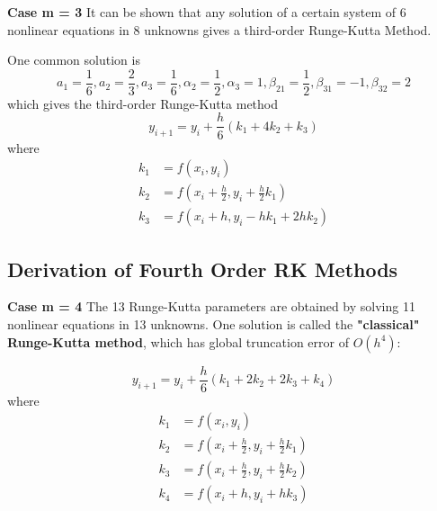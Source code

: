 \documentclass [titlepage,12pt,letter] {article}
\begin{document}
{\bf Case  m = 3}
It can be shown that any solution of a certain system of 6 nonlinear equations in 8 unknowns gives a third-order Runge-Kutta Method.

One common solution is
\[
a_1=\frac{1}{6}, a_2=\frac{2}{3}, a_3=\frac{1}{6}, \alpha_2=\frac{1}{2}, \alpha_3=1, \beta_{21}=\frac{1}{2}, \beta_{31}=-1, \beta_{32}=2
\]
which gives the third-order Runge-Kutta method
\[
y_{i+1}=y_i+\frac{h}{6}(k_1+4k_2+k_3)
\]
where
\begin{align*}
k_1 &= f(x_i,y_i) \\
k_2 & = f\left(x_i+\frac{h}{2},y_i+\frac{h}{2}k_1\right) \\
k_3 &= f(x_i+h,y_i-hk_1+2hk_2)
\end{align*}

\subsection{Derivation of Fourth Order RK Methods}  

{\bf Case  m = 4}
The 13 Runge-Kutta parameters are obtained by solving 11 nonlinear equations in 13 unknowns. One solution is called the {\bf "classical" Runge-Kutta method}, which has global truncation error of $O(h^4)$:

\[
y_{i+1}=y_i+\frac{h}{6}(k_1+2k_2+2k_3+k_4)
\]
where
\begin{align*}
k_1 &= f(x_i,y_i) \\
k_2 & = f\left(x_i+\frac{h}{2},y_i+\frac{h}{2}k_1\right) \\
k_3 & = f\left(x_i+\frac{h}{2},y_i+\frac{h}{2}k_2\right) \\
k_4 &= f(x_i+h,y_i+hk_3)
\end{align*}
\end{document}
